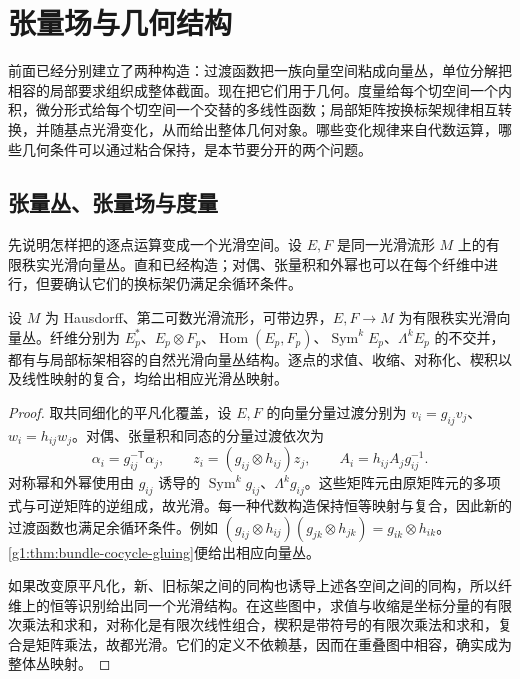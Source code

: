 
% 
% 
% 

\section{张量场与几何结构}
\label{g1:sec:1204}

前面已经分别建立了两种构造：过渡函数把一族向量空间粘成向量丛，单位分解把相容的局部要求组织成整体截面。现在把它们用于几何。度量给每个切空间一个内积，微分形式给每个切空间一个交替的多线性函数；局部矩阵按换标架规律相互转换，并随基点光滑变化，从而给出整体几何对象。哪些变化规律来自代数运算，哪些几何条件可以通过粘合保持，是本节要分开的两个问题。

\subsection{张量丛、张量场与度量}
\label{g1:subsec:1204:01}

先说明怎样把的逐点运算变成一个光滑空间。设 \(E,F\) 是同一光滑流形 \(M\) 上的有限秩实光滑向量丛。直和已经构造；对偶、张量积和外幂也可以在每个纤维中进行，但要确认它们的换标架仍满足余循环条件。

\begin{proposition}
	\label{g1:prop:tensor-bundle-constructions}
	设 \(M\) 为 Hausdorff、第二可数光滑流形，可带边界，\(E,F\to M\) 为有限秩实光滑向量丛。纤维分别为 \(E_p^*\)、\(E_p\otimes F_p\)、\(\operatorname{Hom}(E_p,F_p)\)、\(\operatorname{Sym}^kE_p\)、\(\Lambda^kE_p\) 的不交并，都有与局部标架相容的自然光滑向量丛结构。逐点的求值、收缩、对称化、楔积以及线性映射的复合，均给出相应光滑丛映射。
\end{proposition}

\begin{proof}
	取共同细化的平凡化覆盖，设 \(E,F\) 的向量分量过渡分别为 \(v_i=g_{ij}v_j\)、\(w_i=h_{ij}w_j\)。对偶、张量积和同态的分量过渡依次为
	\[
		\alpha_i=g_{ij}^{-\mathsf T}\alpha_j,\qquad
		z_i=(g_{ij}\otimes h_{ij})z_j,\qquad
		A_i=h_{ij}A_jg_{ij}^{-1}.
	\]
	对称幂和外幂使用由 \(g_{ij}\) 诱导的 \(\operatorname{Sym}^kg_{ij}\)、\(\Lambda^kg_{ij}\)。这些矩阵元由原矩阵元的多项式与可逆矩阵的逆组成，故光滑。每一种代数构造保持恒等映射与复合，因此新的过渡函数也满足余循环条件。例如 \((g_{ij}\otimes h_{ij})(g_{jk}\otimes h_{jk})=g_{ik}\otimes h_{ik}\)。\cref{g1:thm:bundle-cocycle-gluing}便给出相应向量丛。

	如果改变原平凡化，新、旧标架之间的同构也诱导上述各空间之间的同构，所以纤维上的恒等识别给出同一个光滑结构。在这些图中，求值与收缩是坐标分量的有限次乘法和求和，对称化是有限次线性组合，楔积是带符号的有限次乘法和求和，复合是矩阵乘法，故都光滑。它们的定义不依赖基，因而在重叠图中相容，确实成为整体丛映射。
\end{proof}

